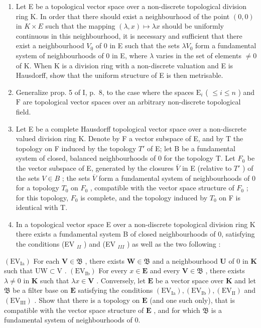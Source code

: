 \begin{enumerate}
\def\labelenumi{\arabic{enumi})}
\setcounter{enumi}{7}
\item
  Let E be a topological vector space over a non-discrete topological division ring K. In order that there should exist a neighbourhood of the point \((0,0)\) in \(K \times E\) such that the mapping \((\lambda, x) \mapsto \lambda x\) should be uniformly continuous in this neighbourhood, it is necessary and sufficient that there exist a neighbourhood \(V_{0}\) of 0 in E such that the sets \(\lambda V_{0}\) form a fundamental system of neighbourhoods of 0 in E, where \(\lambda\) varies in the set of elements \(\neq 0\) of K. When K is a division ring with a non-discrete valuation and E is Hausdorff, show that the uniform structure of E is then metrisable.
\item
  Generalize prop. 5 of I, p.~8, to the case where the spaces \(\mathrm{E}_i\) ( \(\leqslant i \leqslant n\) ) and \(\mathrm{F}\) are topological vector spaces over an arbitrary non-discrete topological field.
\item
  Let E be a complete Hausdorff topological vector space over a non-discrete valued division ring K. Denote by F a vector subspace of E, and by T the topology on F induced by the topology \(T'\) of E; let B be a fundamental system of closed, balanced neighbourhoods of 0 for the topology T. Let \(F_{0}\) be the vector subspace of E, generated by the closures \(\overline{V}\) in E (relative to \(T'\) ) of the sets \(V \in B\) ; the sets \(\overline{V}\) form a fundamental system of neighbourhoods of 0 for a topology \(T_{0}\) on \(F_{0}\) , compatible with the vector space structure of \(F_{0}\) ; for this topology, \(F_{0}\) is complete, and the topology induced by \(T_{0}\) on F is identical with T.
\item
  In a topological vector space E over a non-discrete topological division ring K there exists a fundamental system B of closed neighbourhoods of 0, satisfying the conditions (EV \(_{II}\) ) and (EV \(_{III}\) ) as well as the two following :
\end{enumerate}

\((\mathrm{EV}_{\mathrm{Ia}})\) For each \(\mathbf{V} \in \mathfrak{B}\) , there exists \(\mathbf{W} \in \mathfrak{B}\) and a neighbourhood \(\mathbf{U}\) of 0 in \(\mathbf{K}\) such that \(\mathrm{UW} \subset \mathrm{V}\) . \((\mathrm{EV}_{\mathrm{Ib}})\) For every \(x \in \mathbf{E}\) and every \(\mathbf{V} \in \mathfrak{B}\) , there exists \(\lambda \neq 0\) in \(\mathbf{K}\) such that \(\lambda x \in \mathbf{V}\) . Conversely, let \(\mathbf{E}\) be a vector space over \(\mathbf{K}\) and let \(\mathfrak{B}\) be a filter base on \(\mathbf{E}\) satisfying the conditions \((\mathrm{EV}_{\mathrm{Ia}}), (\mathrm{EV}_{\mathrm{Ib}}), (\mathrm{EV}_{\mathrm{II}})\) and \((\mathrm{EV}_{\mathrm{III}})\) . Show that there is a topology on \(\mathbf{E}\) (and one such only), that is compatible with the vector space structure of \(\mathbf{E}\) , and for which \(\mathfrak{B}\) is a fundamental system of neighbourhoods of 0.

